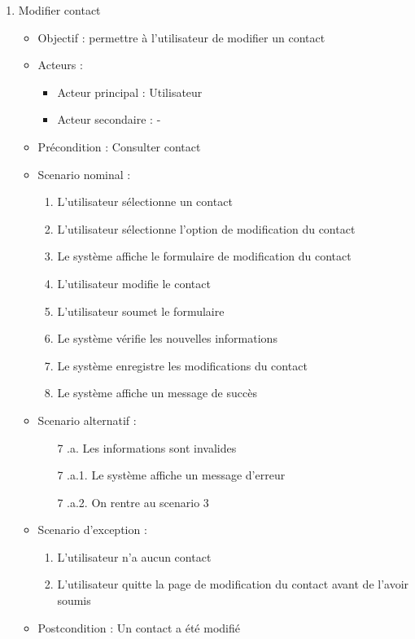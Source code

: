 \begin{enumerate}[label=\alph*.]
	\item Modifier contact
	\begin{itemize}
		\item Objectif : permettre à l’utilisateur de modifier un contact
		\item Acteurs :
		\begin{itemize}
			\item Acteur principal : Utilisateur
			\item Acteur secondaire : -
		\end{itemize}
		\item Précondition : Consulter contact
		\item Scenario nominal :
		\begin{enumerate}[label=\arabic*.]
			\item L’utilisateur sélectionne un contact
			\item L’utilisateur sélectionne l’option de modification du contact
			\item Le système affiche le formulaire de modification du contact
			\item L’utilisateur modifie le contact
			\item L’utilisateur soumet le formulaire
			\item Le système vérifie les nouvelles informations
			\item Le système enregistre les modifications du contact
			\item Le système affiche un message de succès
		\end{enumerate}
		\item Scenario alternatif :
		\begin{enumerate}[label=\arabic*.]
			\item[7] .a. Les informations sont invalides
			\item[7] .a.1. Le système affiche un message d’erreur
			\item[7] .a.2. On rentre au scenario 3
		\end{enumerate}
		\item Scenario d’exception : 
		\begin{enumerate}[label=\arabic*.]
			\item L’utilisateur n’a aucun contact
			\item L’utilisateur quitte la page de modification du contact avant de l’avoir soumis
		\end{enumerate}
		\item Postcondition : Un contact a été modifié
	\end{itemize}	
	

\end{enumerate}
